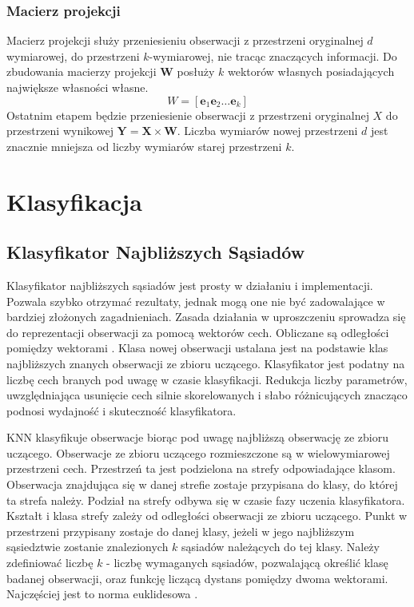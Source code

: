 \documentclass[a4paper,12pt,twoside,openany]{report}
\renewcommand{\vec}[1]{\bm{#1}}
\begin{document}
\subsubsection{Macierz projekcji}
Macierz projekcji służy przeniesieniu obserwacji z przestrzeni oryginalnej $d$ wymiarowej,
do przestrzeni $k$-wymiarowej, nie tracąc znaczących informacji.
Do zbudowania macierzy projekcji $\vec W$ posłuży $k$ wektorów własnych posiadających największe własności własne.
\begin{equation}
	W = [\vec e_1 \vec e_2 \dots \vec e_k]
\end{equation}
Ostatnim etapem będzie przeniesienie obserwacji z przestrzeni oryginalnej $X$ do przestrzeni wynikowej $\vec Y = \vec X \times \vec W$.
Liczba wymiarów nowej przestrzeni $d$ jest znacznie mniejsza od liczby wymiarów starej przestrzeni $k$.
\section{Klasyfikacja}
\subsection{Klasyfikator Najbliższych Sąsiadów}
Klasyfikator najbliższych sąsiadów jest prosty w działaniu i implementacji.
Pozwala szybko otrzymać rezultaty, jednak mogą one nie być zadowalające w bardziej złożonych zagadnieniach.
Zasada działania w uproszczeniu sprowadza się do reprezentacji obserwacji za pomocą wektorów cech.
Obliczane są odległości pomiędzy wektorami \cite{Du2013}.
Klasa nowej obserwacji ustalana jest na podstawie klas najbliższych znanych obserwacji ze zbioru uczącego.
Klasyfikator jest podatny na liczbę cech branych pod uwagę w czasie klasyfikacji.
Redukcja liczby parametrów, uwzględniająca usunięcie cech silnie skorelowanych i słabo różnicujących znacząco podnosi wydajność i skuteczność klasyfikatora.

KNN klasyfikuje obserwacje biorąc pod uwagę najbliższą obserwację ze zbioru uczącego.
Obserwacje ze zbioru uczącego rozmieszczone są w wielowymiarowej przestrzeni cech.
Przestrzeń ta jest podzielona na strefy odpowiadające klasom.
Obserwacja znajdująca się w danej strefie zostaje przypisana do klasy, do której ta strefa należy.
Podział na strefy odbywa się w czasie fazy uczenia klasyfikatora.
Kształt i klasa strefy zależy od odległości obserwacji ze zbioru uczącego.
Punkt w przestrzeni przypisany zostaje do danej klasy, jeżeli w jego najbliższym sąsiedztwie zostanie znalezionych $k$ sąsiadów należących do tej klasy.
Należy zdefiniować liczbę $k$ - liczbę wymaganych sąsiadów, pozwalającą określić klasę badanej obserwacji, 
oraz funkcję liczącą dystans pomiędzy dwoma wektorami. Najczęściej jest to norma euklidesowa \cite{Martin2011}.
\end{document}
